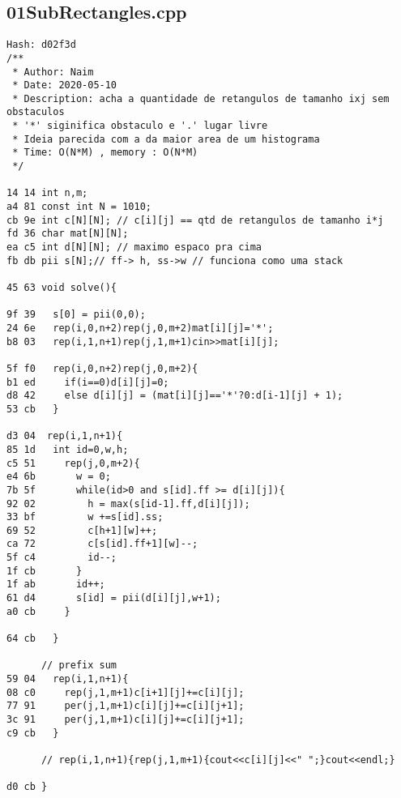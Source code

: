 \documentclass[11pt, a4paper, twoside]{article}
\begin{document}
\subsection{01SubRectangles.cpp}
\begin{lstlisting}
Hash: d02f3d
/**
 * Author: Naim
 * Date: 2020-05-10
 * Description: acha a quantidade de retangulos de tamanho ixj sem obstaculos
 * '*' siginifica obstaculo e '.' lugar livre
 * Ideia parecida com a da maior area de um histograma
 * Time: O(N*M) , memory : O(N*M)
 */

14 14 int n,m;
a4 81 const int N = 1010; 
cb 9e int c[N][N]; // c[i][j] == qtd de retangulos de tamanho i*j
fd 36 char mat[N][N];
ea c5 int d[N][N]; // maximo espaco pra cima
fb db pii s[N];// ff-> h, ss->w // funciona como uma stack

45 63 void solve(){
      
9f 39   s[0] = pii(0,0);
24 6e   rep(i,0,n+2)rep(j,0,m+2)mat[i][j]='*';
b8 03   rep(i,1,n+1)rep(j,1,m+1)cin>>mat[i][j];
      
5f f0   rep(i,0,n+2)rep(j,0,m+2){
b1 ed     if(i==0)d[i][j]=0;
d8 42     else d[i][j] = (mat[i][j]=='*'?0:d[i-1][j] + 1);
53 cb   }
      
d3 04  rep(i,1,n+1){
85 1d   int id=0,w,h;
c5 51     rep(j,0,m+2){
e4 6b       w = 0;
7b 5f       while(id>0 and s[id].ff >= d[i][j]){
92 02         h = max(s[id-1].ff,d[i][j]);
33 bf         w +=s[id].ss;
69 52         c[h+1][w]++;
ca 72         c[s[id].ff+1][w]--;
5f c4         id--;
1f cb       }
1f ab       id++;
61 d4       s[id] = pii(d[i][j],w+1);
a0 cb     }
        
64 cb   }
      
      // prefix sum
59 04   rep(i,1,n+1){
08 c0     rep(j,1,m+1)c[i+1][j]+=c[i][j];
77 91     per(j,1,m+1)c[i][j]+=c[i][j+1];
3c 91     per(j,1,m+1)c[i][j]+=c[i][j+1];
c9 cb   }
      
      // rep(i,1,n+1){rep(j,1,m+1){cout<<c[i][j]<<" ";}cout<<endl;}
      
d0 cb }
\end{lstlisting}
\end{document}
